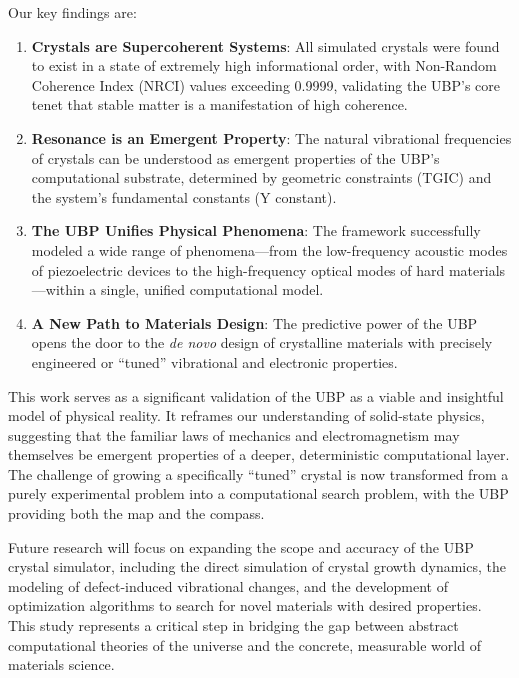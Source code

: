 Our key findings are:

\begin{enumerate}
\def\labelenumi{\arabic{enumi}.}
\item
  \textbf{Crystals are Supercoherent Systems}: All simulated crystals
  were found to exist in a state of extremely high informational order,
  with Non-Random Coherence Index (NRCI) values exceeding 0.9999,
  validating the UBP's core tenet that stable matter is a manifestation
  of high coherence.
\item
  \textbf{Resonance is an Emergent Property}: The natural vibrational
  frequencies of crystals can be understood as emergent properties of
  the UBP's computational substrate, determined by geometric constraints
  (TGIC) and the system's fundamental constants (Y constant).
\item
  \textbf{The UBP Unifies Physical Phenomena}: The framework
  successfully modeled a wide range of phenomena---from the
  low-frequency acoustic modes of piezoelectric devices to the
  high-frequency optical modes of hard materials---within a single,
  unified computational model.
\item
  \textbf{A New Path to Materials Design}: The predictive power of the
  UBP opens the door to the \emph{de novo} design of crystalline
  materials with precisely engineered or ``tuned'' vibrational and
  electronic properties.
\end{enumerate}

This work serves as a significant validation of the UBP as a viable and
insightful model of physical reality. It reframes our understanding of
solid-state physics, suggesting that the familiar laws of mechanics and
electromagnetism may themselves be emergent properties of a deeper,
deterministic computational layer. The challenge of growing a
specifically ``tuned'' crystal is now transformed from a purely
experimental problem into a computational search problem, with the UBP
providing both the map and the compass.

Future research will focus on expanding the scope and accuracy of the
UBP crystal simulator, including the direct simulation of crystal growth
dynamics, the modeling of defect-induced vibrational changes, and the
development of optimization algorithms to search for novel materials
with desired properties. This study represents a critical step in
bridging the gap between abstract computational theories of the universe
and the concrete, measurable world of materials science.

